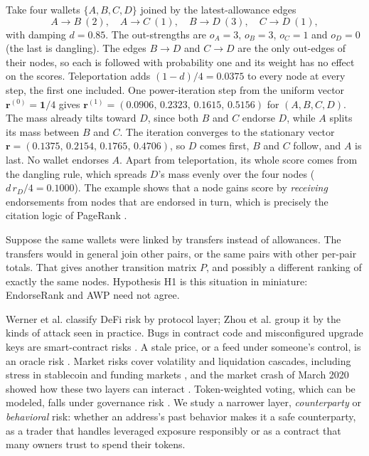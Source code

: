 Take four wallets $\{A,B,C,D\}$ joined by the latest-allowance edges
\[
A\to B\ (2),\quad A\to C\ (1),\quad B\to D\ (3),\quad C\to D\ (1),
\]
with damping $d=0.85$. The out-strengths are $o_A=3$, $o_B=3$, $o_C=1$ and $o_D=0$ (the last is dangling). The edges $B\to D$ and $C\to D$ are the only out-edges of their nodes, so each is followed with probability one and its weight has no effect on the scores. Teleportation adds $(1-d)/4=0.0375$ to every node at every step, the first one included. One power-iteration step from the uniform vector $\mathbf{r}^{(0)}=\mathbf{1}/4$ gives $\mathbf{r}^{(1)}=(0.0906,\,0.2323,\,0.1615,\,0.5156)$ for $(A,B,C,D)$. The mass already tilts toward $D$, since both $B$ and $C$ endorse $D$, while $A$ splits its mass between $B$ and $C$. The iteration converges to the stationary vector $\mathbf{r}=(0.1375,\,0.2154,\,0.1765,\,0.4706)$, so $D$ comes first, $B$ and $C$ follow, and $A$ is last. No wallet endorses $A$. Apart from teleportation, its whole score comes from the dangling rule, which spreads $D$'s mass evenly over the four nodes ($d\,r_D/4=0.1000$). The example shows that a node gains score by \emph{receiving} endorsements from nodes that are endorsed in turn, which is precisely the citation logic of PageRank .

Suppose the same wallets were linked by transfers instead of allowances. The transfers would in general join other pairs, or the same pairs with other per-pair totals. That gives another transition matrix $P$, and possibly a different ranking of exactly the same nodes. Hypothesis H1 is this situation in miniature: EndorseRank and AWP need not agree.


Werner et al. classify DeFi risk by protocol layer; Zhou et al. group it by the kinds of attack seen in practice. Bugs in contract code and misconfigured upgrade keys are smart-contract risks . A stale price, or a feed under someone's control, is an oracle risk . Market risks  cover volatility and liquidation cascades, including stress in stablecoin and funding markets , and the market crash of March 2020 showed how these two layers can interact . Token-weighted voting, which can be modeled, falls under governance risk . We study a narrower layer, \emph{counterparty} or \emph{behavioral} risk: whether an address's past behavior makes it a safe counterparty, as a trader that handles leveraged exposure responsibly or as a contract that many owners trust to spend their tokens.


